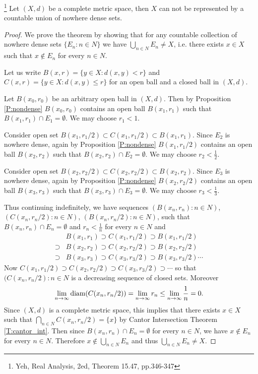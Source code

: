 \begin{theorem} \label{T:baire}
\footnote{Yeh, Real Analysis, 2ed, Theorem 15.47, pp.346-347}
Let $(X,d)$ be a complete metric space, then $X$ can not be represented by a
countable union of nowhere dense sets.
\end{theorem}
\begin{proof}
We prove the theorem by showing that for any countable collection of nowhere
dense sets $\{E_n:n\in N\}$ we have $\bigcup_{n\in N} E_n\neq X$, i.e. there exists
$x\in X$ such that $x\notin E_n$ for every $n\in N$.

Let us write $B(x,r)=\{y\in X:d(x,y)<r\}$ and $C(x,r)=\{y\in X:d(x,y)\le r\}$
for an open ball and a closed ball in $(X,d)$.

Let $B(x_0,r_0)$ be an arbitrary open ball in $(X,d)$. Then by Proposition
\ref{P:nondense} $B(x_0,r_0)$ contains an open ball $B(x_1,r_1)$ such that
$B(x_1,r_1)\cap E_1=\emptyset$. We may choose $r_1<1$.

Consider open set $B(x_1,r_1/2)\subset C(x_1,r_1/2)\subset B(x_1,r_1)$. Since
$E_2$ is nowhere dense, again by Proposition \ref{P:nondense} $B(x_1,r_1/2)$
contains an open ball $B(x_2,r_2)$ such that $B(x_2,r_2)\cap E_2=\emptyset$. We
may choose $r_2<\frac{1}{2}$.

Consider open set $B(x_2,r_2/2)\subset C(x_2,r_2/2)\subset B(x_2,r_2)$. Since
$E_3$ is nowhere dense, again by Proposition \ref{P:nondense} $B(x_2,r_2/2)$
contains an open ball $B(x_3,r_3)$ such that $B(x_3,r_3)\cap E_3=\emptyset$. We
may choose $r_3<\frac{1}{3}$.

Thus continuing indefinitely, we have sequences $(B(x_n,r_n):n\in N)$,
$(C(x_n,r_n/2):n\in N)$, $(B(x_n,r_n/2):n\in N)$, such that 
$B(x_n,r_n)\cap E_n=\emptyset$ and $r_n<\frac{1}{n}$ for every $n\in N$ and
\begin{align*}
	        & B(x_1,r_1) \supset C(x_1,r_1/2) \supset B(x_1,r_1/2)  \\
	\supset & B(x_2,r_2) \supset C(x_2,r_2/2) \supset B(x_2,r_2/2)  \\
	\supset & B(x_3,r_3) \supset C(x_3,r_3/2) \supset B(x_3,r_3/2) \cdots  
\end{align*}
Now $C(x_1,r_1/2) \supset C(x_2,r_2/2) \supset C(x_3,r_3/2)\supset\cdots$ so
that $(C(x_n,r_n/2):n\in N$ is a decreasing sequence of closed sets. Moreover
\[
	\lim_{n\to\infty} \operatorname*{diam}(C(x_n,r_n/2))
	  = \lim_{n\to\infty} r_n
	  \le\lim_{n\to\infty}\frac{1}{n} = 0.
\]
Since $(X,d)$ is a complete metric space,
this implies that there exists $x\in X$ such that
$\bigcap_{n\in N} C(x_n,r_n/2)=\{x\}$ by Cantor Intersection Theorem
\ref{T:cantor_int}. Then since $B(x_n,r_n)\cap E_n=\emptyset$ for every 
$n\in N$, we have $x\notin E_n$ for every $n\in N$. Therefore
$x\notin\bigcup_{n\in N} E_n$ and thus $\bigcup_{n\in N} E_n\neq X$. 
\end{proof}

